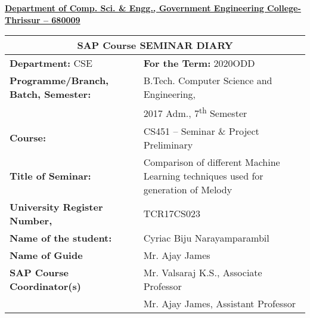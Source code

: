 \documentclass[12pt,a4paper]{article}
\renewcommand{\arraystretch}{1.3}
\begin{document}
\begin{center}
	\textbf{
		\underline {Department of Comp. Sci. \& Engg., Government 
Engineering College-Thrissur -- 680009}
	}
\end{center}



\begin{center}

\begin{tabularx}{1\textwidth}{|X|X|}
	\hline
	\hline
	\multicolumn{2}{|c|}{\textbf{SAP Course SEMINAR DIARY}}\\
	\hline
	\textbf{Department:} CSE & \textbf{For the Term:} 2020ODD\\
	\hline
	\textbf{Programme/Branch, Batch, Semester:} & B.Tech. Computer 
Science and Engineering,\\ & 2017 Adm., 
7\textsuperscript{th} Semester\\
	\hline
	\textbf{Course:} & CS451 – Seminar \& Project Preliminary\\
	\hline
	\textbf{Title of Seminar:} & Comparison of different Machine Learning techniques used for generation of Melody \\[50pt]
	\hline
	\textbf{University Register Number,} & TCR17CS023 \\ 
	\textbf{Name of the student: } & Cyriac Biju Narayamparambil\\
	\hline
	\textbf{Name of Guide} & Mr. Ajay James \\
	\hline
	\textbf{SAP Course Coordinator(s)} & Mr. Valsaraj K.S., Associate 
Professor\\ & Mr. Ajay James, Assistant Professor\\
	\hline
	\hline
\end{tabularx}



\renewcommand{\arraystretch}{1.3}


\end{center}
\end{document}
